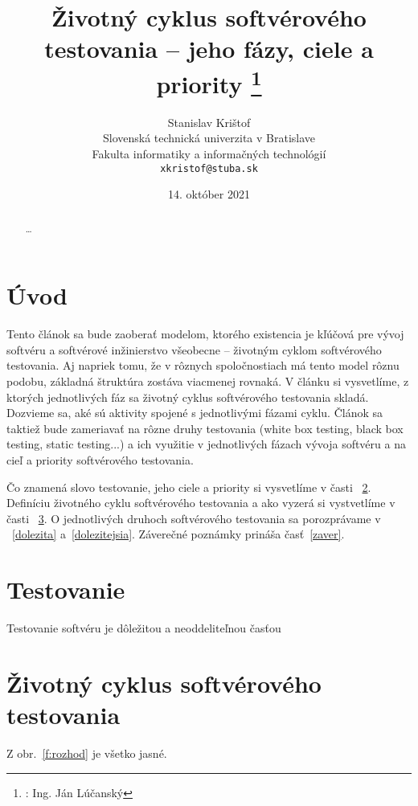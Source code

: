 \documentclass[10pt,twoside,slovak,a4paper]{article}
\title{Životný cyklus softvérového testovania – jeho fázy, ciele a priority
\thanks{: Ing. Ján Lúčanský}} %
\author{Stanislav Krištof\\[2pt]
	{\small Slovenská technická univerzita v Bratislave}\\
	{\small Fakulta informatiky a informačných technológií}\\
	{\small \texttt{xkristof@stuba.sk}}
	}
\date{\small 14. október 2021} %
\begin{document}
\maketitle
\begin{abstract}
\ldots
\end{abstract}



\section{Úvod}
Tento článok sa bude zaoberať modelom, ktorého existencia je kľúčová pre vývoj softvéru a 
softvérové inžinierstvo všeobecne – životným cyklom softvérového testovania. Aj napriek tomu, že 
v rôznych spoločnostiach má tento model rôznu podobu, základná štruktúra zostáva viacmenej 
rovnaká. V článku si vysvetlíme, z ktorých jednotlivých fáz sa životný cyklus softvérového 
testovania skladá. Dozvieme sa, aké sú aktivity spojené s jednotlivými fázami cyklu. Článok sa 
taktiež bude zameriavať na rôzne druhy testovania (white box testing, black box testing, static 
testing...) a ich využitie v jednotlivých fázach vývoja softvéru a na cieľ a priority softvérového 
testovania.

Čo znamená slovo testovanie, jeho ciele a priority si vysvetlíme v časti ~\ref{testovanie}.
Definíciu životného cyklu softvérového testovania a ako vyzerá si vystvetlíme v časti ~\ref{diagram}.
O jednotlivých druhoch softvérového testovania sa porozprávame v ~\ref{dolezita} a~\ref{dolezitejsia}.
Záverečné poznámky prináša časť~\ref{zaver}.



\section{Testovanie} \label{testovanie}

\begin{figure*}[tbh]
\centering
Testovanie softvéru je dôležitou a neoddeliteľnou časťou
\end{figure*}


\section{Životný cyklus softvérového testovania} \label{diagram}




Z obr.~\ref{f:rozhod} je všetko jasné. 
\end{document}
